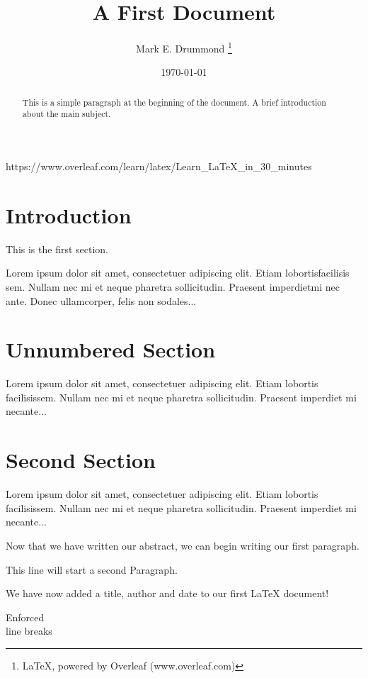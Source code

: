 \documentclass[11pt, letterpaper]{article}
\title{A First Document}
\author{Mark E. Drummond \thanks{\LaTeX, powered by Overleaf (www.overleaf.com)}}
\date{\today}
\begin{document}
\maketitle

\tableofcontents

\begin{abstract}
    This is a simple paragraph at the beginning of the 
document. A brief introduction about the main subject.
\end{abstract}

https://www.overleaf.com/learn/latex/Learn\_LaTeX\_in\_30\_minutes

\section{Introduction}
 
This is the first section.
 
Lorem  ipsum  dolor  sit  amet,  consectetuer  adipiscing  
elit.   Etiam  lobortisfacilisis sem.  Nullam nec mi et 
neque pharetra sollicitudin.  Praesent imperdietmi nec ante. 
Donec ullamcorper, felis non sodales...
 
\section*{Unnumbered Section}
 
Lorem ipsum dolor sit amet, consectetuer adipiscing elit.  
Etiam lobortis facilisissem.  Nullam nec mi et neque pharetra 
sollicitudin.  Praesent imperdiet mi necante...
 
\section{Second Section}
 
Lorem ipsum dolor sit amet, consectetuer adipiscing elit.  
Etiam lobortis facilisissem.  Nullam nec mi et neque pharetra 
sollicitudin.  Praesent imperdiet mi necante...

Now that we have written our abstract, we can begin writing our first paragraph.


This line will start a second Paragraph.


We have now added a title, author and date to our first \LaTeX{} document!

Enforced \\
line
\newline
breaks
\end{document}
